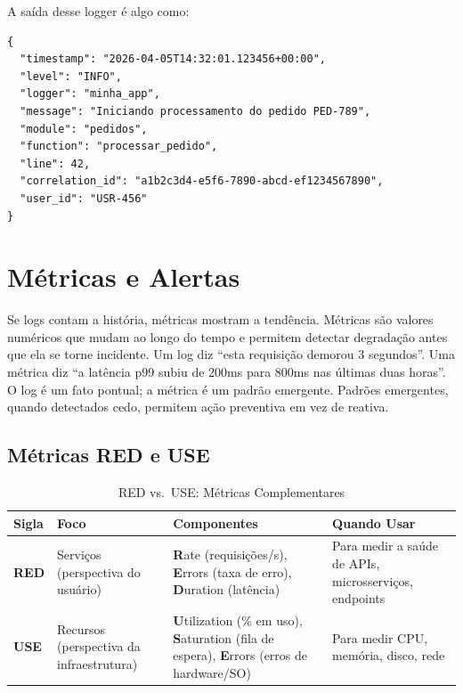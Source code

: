 A saída desse logger é algo como:

\begin{lstlisting}[language={}, caption={Exemplo de saída do log estruturado}]
{
  "timestamp": "2026-04-05T14:32:01.123456+00:00",
  "level": "INFO",
  "logger": "minha_app",
  "message": "Iniciando processamento do pedido PED-789",
  "module": "pedidos",
  "function": "processar_pedido",
  "line": 42,
  "correlation_id": "a1b2c3d4-e5f6-7890-abcd-ef1234567890",
  "user_id": "USR-456"
}
\end{lstlisting}

\section{Métricas e Alertas}

Se logs contam a história, métricas mostram a tendência. Métricas são valores
numéricos que mudam ao longo do tempo e permitem detectar degradação antes que
ela se torne incidente. Um log diz ``esta requisição demorou 3 segundos''. Uma
métrica diz ``a latência p99 subiu de 200ms para 800ms nas últimas duas horas''.
O log é um fato pontual; a métrica é um padrão emergente. Padrões emergentes,
quando detectados cedo, permitem ação preventiva em vez de reativa.

\subsection{Métricas RED e USE}

\begin{table}[h]
\centering
\caption{RED vs.\ USE: Métricas Complementares}
\begin{tabular}{>{\bfseries}p{1.5cm} p{3.5cm} p{3.5cm} p{3.5cm}}
\toprule
Sigla & Foco & Componentes & Quando Usar \\
\midrule
RED & Serviços (perspectiva do usuário) &
    \textbf{R}ate (requisições/s), \textbf{E}rrors (taxa de erro),
    \textbf{D}uration (latência) &
    Para medir a saúde de APIs, microsserviços, endpoints \\
\addlinespace
USE & Recursos (perspectiva da infraestrutura) &
    \textbf{U}tilization (\% em uso), \textbf{S}aturation (fila de espera),
    \textbf{E}rrors (erros de hardware/SO) &
    Para medir CPU, memória, disco, rede \\
\bottomrule
\end{tabular}
\end{table}

